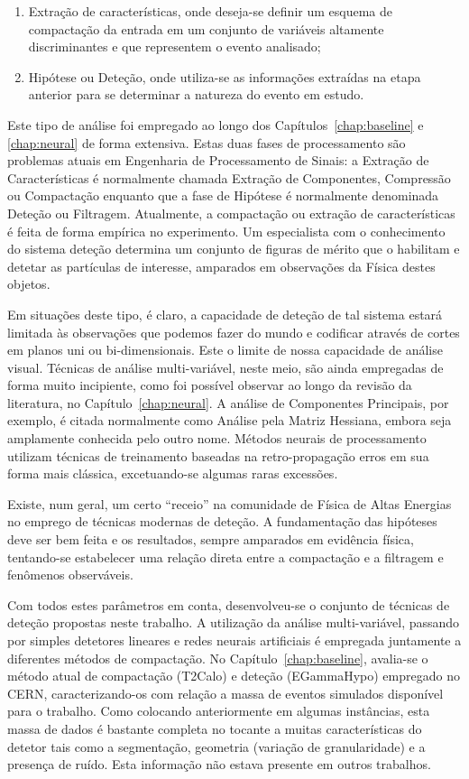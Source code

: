 \begin{enumerate}
\item Extração de características, onde deseja-se definir um esquema de
compactação da entrada em um conjunto de variáveis altamente discriminantes e
que representem o evento analisado;
\item Hipótese ou Deteção, onde utiliza-se as informações extraídas na etapa
anterior para se determinar a natureza do evento em estudo.
\end{enumerate}

Este tipo de análise foi empregado ao longo dos Capítulos~\ref{chap:baseline}
e \ref{chap:neural} de forma extensiva. Estas duas fases de processamento são
problemas atuais em Engenharia de Processamento de Sinais: a Extração de
Características é normalmente chamada Extração de Componentes, Compressão ou
Compactação enquanto que a fase de Hipótese é normalmente denominada Deteção
ou Filtragem. Atualmente, a compactação ou extração de características é feita
de forma empírica no experimento. Um especialista \cite{nevski-calor-1992} com
o conhecimento do sistema deteção determina um conjunto de figuras de mérito
que o habilitam e detetar as partículas de interesse, amparados em observações
da Física destes objetos.

Em situações deste tipo, é claro, a capacidade de deteção de tal sistema
estará limitada às observações que podemos fazer do mundo e codificar através
de cortes em planos uni ou bi-dimensionais. Este o limite de nossa capacidade
de análise visual. Técnicas de análise multi-variável, neste meio, são ainda
empregadas de forma muito incipiente, como foi possível observar ao longo da
revisão da literatura, no Capítulo~\ref{chap:neural}. A análise de Componentes
Principais, por exemplo, é citada normalmente como Análise pela Matriz
Hessiana, embora seja amplamente conhecida pelo outro nome. Métodos neurais de
processamento utilizam técnicas de treinamento baseadas na retro-propagação
erros em sua forma mais clássica, excetuando-se algumas raras excessões.

Existe, num geral, um certo ``receio'' na comunidade de Física de Altas
Energias no emprego de técnicas modernas de deteção. A fundamentação das
hipóteses deve ser bem feita e os resultados, sempre amparados em evidência
física, tentando-se estabelecer uma relação direta entre a compactação e a
filtragem e fenômenos observáveis. 

Com todos estes parâmetros em conta, desenvolveu-se o conjunto de técnicas de
deteção propostas neste trabalho. A utilização da análise multi-variável,
passando por simples detetores lineares e redes neurais artificiais é
empregada juntamente a diferentes métodos de compactação. No
Capítulo~\ref{chap:baseline}, avalia-se o método atual de compactação (T2Calo)
e deteção (EGammaHypo) empregado no CERN, caracterizando-os com relação a
massa de eventos simulados disponível para o trabalho. Como colocando
anteriormente em algumas instâncias, esta massa de dados é bastante completa
no tocante a muitas características do detetor tais como a segmentação,
geometria (variação de granularidade) e a presença de ruído. Esta informação
não estava presente em outros trabalhos. 

